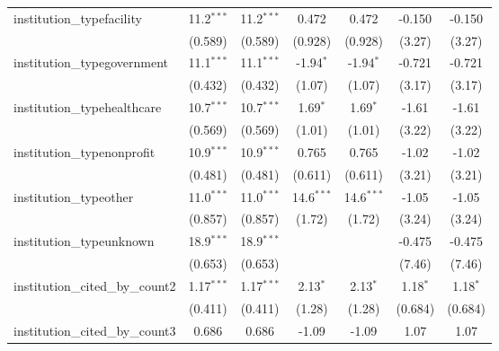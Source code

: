 \begin{tabular}{lcccccc}
   institution\_typefacility             & 11.2$^{***}$  & 11.2$^{***}$  & 0.472         & 0.472         & -0.150        & -0.150\\   
                                         & (0.589)       & (0.589)       & (0.928)       & (0.928)       & (3.27)        & (3.27)\\   
   institution\_typegovernment           & 11.1$^{***}$  & 11.1$^{***}$  & -1.94$^{*}$   & -1.94$^{*}$   & -0.721        & -0.721\\   
                                         & (0.432)       & (0.432)       & (1.07)        & (1.07)        & (3.17)        & (3.17)\\   
   institution\_typehealthcare           & 10.7$^{***}$  & 10.7$^{***}$  & 1.69$^{*}$    & 1.69$^{*}$    & -1.61         & -1.61\\   
                                         & (0.569)       & (0.569)       & (1.01)        & (1.01)        & (3.22)        & (3.22)\\   
   institution\_typenonprofit            & 10.9$^{***}$  & 10.9$^{***}$  & 0.765         & 0.765         & -1.02         & -1.02\\   
                                         & (0.481)       & (0.481)       & (0.611)       & (0.611)       & (3.21)        & (3.21)\\   
   institution\_typeother                & 11.0$^{***}$  & 11.0$^{***}$  & 14.6$^{***}$  & 14.6$^{***}$  & -1.05         & -1.05\\   
                                         & (0.857)       & (0.857)       & (1.72)        & (1.72)        & (3.24)        & (3.24)\\   
   institution\_typeunknown              & 18.9$^{***}$  & 18.9$^{***}$  &               &               & -0.475        & -0.475\\   
                                         & (0.653)       & (0.653)       &               &               & (7.46)        & (7.46)\\   
   institution\_cited\_by\_count2        & 1.17$^{***}$  & 1.17$^{***}$  & 2.13$^{*}$    & 2.13$^{*}$    & 1.18$^{*}$    & 1.18$^{*}$\\   
                                         & (0.411)       & (0.411)       & (1.28)        & (1.28)        & (0.684)       & (0.684)\\   
   institution\_cited\_by\_count3        & 0.686         & 0.686         & -1.09         & -1.09         & 1.07          & 1.07\\   

\end{tabular}
